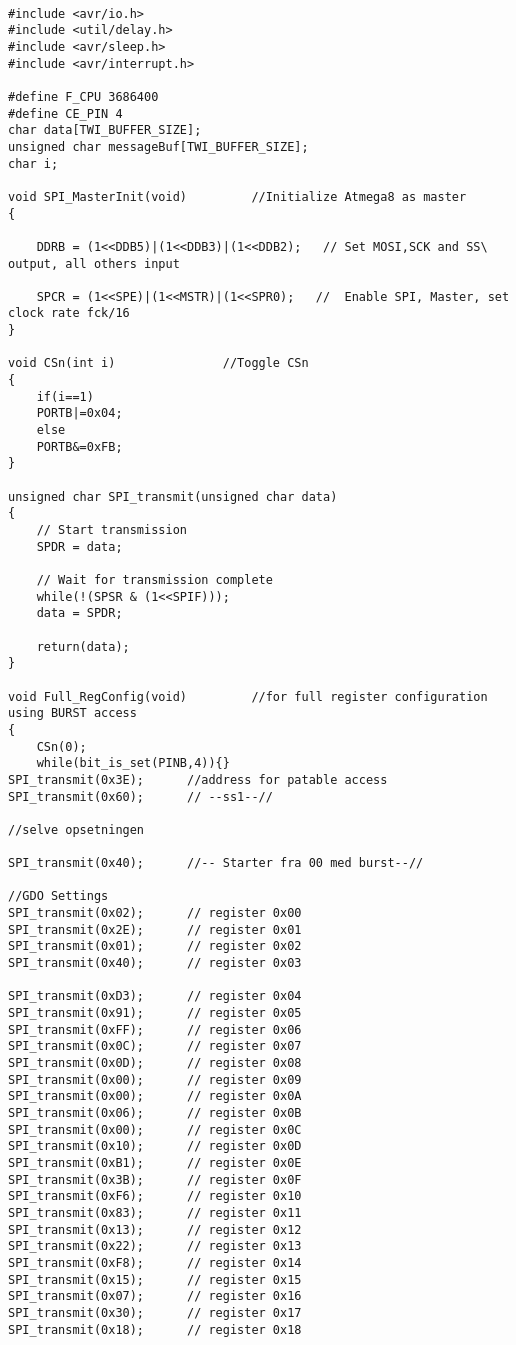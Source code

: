 \documentclass[Main]{subfiles}
\begin{document}
\begin{lstlisting}[caption=Radio integrationstest, style=Code-C, label=lst:PrintMotorOutput]

#include <avr/io.h>
#include <util/delay.h>
#include <avr/sleep.h>
#include <avr/interrupt.h>

#define F_CPU 3686400
#define CE_PIN 4
char data[TWI_BUFFER_SIZE];
unsigned char messageBuf[TWI_BUFFER_SIZE];
char i;

void SPI_MasterInit(void)         //Initialize Atmega8 as master
{
	
	DDRB = (1<<DDB5)|(1<<DDB3)|(1<<DDB2);   // Set MOSI,SCK and SS\ output, all others input
	
	SPCR = (1<<SPE)|(1<<MSTR)|(1<<SPR0);   //  Enable SPI, Master, set clock rate fck/16
}

void CSn(int i)               //Toggle CSn
{
	if(i==1)
	PORTB|=0x04;
	else
	PORTB&=0xFB;
}

unsigned char SPI_transmit(unsigned char data)
{
	// Start transmission
	SPDR = data;

	// Wait for transmission complete
	while(!(SPSR & (1<<SPIF)));
	data = SPDR;

	return(data);
}

void Full_RegConfig(void)         //for full register configuration using BURST access
{
	CSn(0);
	while(bit_is_set(PINB,4)){}
SPI_transmit(0x3E);      //address for patable access
SPI_transmit(0x60);      // --ss1--//

//selve opsetningen

SPI_transmit(0x40);      //-- Starter fra 00 med burst--//

//GDO Settings
SPI_transmit(0x02);      // register 0x00
SPI_transmit(0x2E);      // register 0x01
SPI_transmit(0x01);      // register 0x02
SPI_transmit(0x40);      // register 0x03

SPI_transmit(0xD3);      // register 0x04
SPI_transmit(0x91);      // register 0x05
SPI_transmit(0xFF);      // register 0x06
SPI_transmit(0x0C);      // register 0x07
SPI_transmit(0x0D);      // register 0x08
SPI_transmit(0x00);      // register 0x09
SPI_transmit(0x00);      // register 0x0A
SPI_transmit(0x06);      // register 0x0B
SPI_transmit(0x00);      // register 0x0C
SPI_transmit(0x10);      // register 0x0D
SPI_transmit(0xB1);      // register 0x0E
SPI_transmit(0x3B);      // register 0x0F
SPI_transmit(0xF6);      // register 0x10 
SPI_transmit(0x83);      // register 0x11 
SPI_transmit(0x13);      // register 0x12
SPI_transmit(0x22);      // register 0x13
SPI_transmit(0xF8);      // register 0x14
SPI_transmit(0x15);      // register 0x15
SPI_transmit(0x07);      // register 0x16
SPI_transmit(0x30);      // register 0x17
SPI_transmit(0x18);      // register 0x18


\end{lstlisting}
\end{document}

